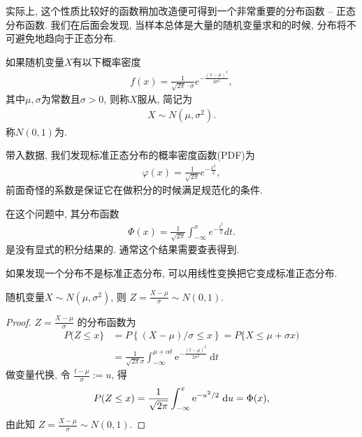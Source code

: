 实际上, 这个性质比较好的函数稍加改造便可得到一个非常重要的分布函数 --
正态分布函数. 我们在后面会发现, 当样本总体是大量的随机变量求和的时候,
分布将不可避免地趋向于正态分布.

\begin{definition}
    如果随机变量$X$有以下概率密度
    \begin{align*}
        f(x)=\frac1{\sqrt{2\pi}\cdot\sigma}e^{-\frac{(x-\mu)^2}{2\sigma^2}},
    \end{align*}
    其中$\mu,\sigma$为常数且$\sigma>0$, 则称$X$服从, 简记为%
    \begin{align*}
        X \sim N(\mu,\sigma^2).
    \end{align*}
    称$N(0,1)$为.
\end{definition}

带入数据, 我们发现标准正态分布的概率密度函数(PDF)为
\begin{align*}
    \varphi(x)=\frac1{\sqrt{2\pi}}e^{-\frac{x^2}{2}},
\end{align*}
前面奇怪的系数是保证它在做积分的时候满足规范化的条件.

在这个问题中, 其分布函数
\begin{align*}
    \Phi(x)=\frac1{\sqrt{2\pi}}\int_{-\infty}^xe^{-\frac{t^2}{2}}dt.
\end{align*}
是没有显式的积分结果的. 通常这个结果需要查表得到.

如果发现一个分布不是标准正态分布, 可以用线性变换把它变成标准正态分布.

\begin{proposition}
    随机变量$X\sim N(\mu,\sigma^2)$, 则 $Z=\frac{X-\mu}{\sigma}\sim N(0,1)$.
\end{proposition}


\begin{proof}
    { $Z=\frac{X-\mu}{\sigma}$ 的分布函数为$$
            \begin{aligned}
                P(Z \leq x\} & =P\left\{{(X-\mu)}/{\sigma} \leq x\right\}=P\{X \leq \mu+\sigma x)                                         \\
                                   & =\frac{1}{\sqrt{2 \pi} \sigma} \int_{-\infty}^{\mu+\alpha t} \mathrm{e}^{-\frac{(t-\mu)^2}{2 \sigma^2}} \mathrm{~d} t
            \end{aligned}
        $$
        做变量代换, 令 $\frac{t-\mu}{\sigma}:=u$, 得$$
            \small P(Z \leq x)=\frac{1}{\sqrt{2 \pi}} \int_{-\infty}^x \mathrm{e}^{-u^2 / 2} \mathrm{~d} u=\Phi(x),
        $$
        由此知 $Z=\frac{X-\mu}{\sigma} \sim N(0,1)$.}
\end{proof}

